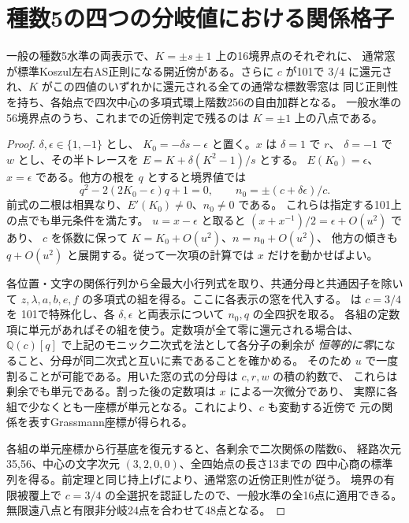 \section{種数5の四つの分岐値における関係格子}
\label{sec:rank-fifteen-pencil-ramified-ends}
\begin{theorem}\label{thm:rank-fifteen-pencil-ramified-ends}
一般の種数5水準の両表示で、$K=\pm s\pm1$ 上の16境界点のそれぞれに、
通常窓が標準Koszul左右AS正則になる開近傍がある。さらに $c$ が101で
$3/4$ に還元され、$K$ がこの四値のいずれかに還元される全ての通常な標数零窓は
同じ正則性を持ち、各始点で四次中心の多項式環上階数256の自由加群となる。
一般水準の56境界点のうち、これまでの近傍判定で残るのは $K=\pm1$ 上の八点である。
\end{theorem}
\begin{proof}
$\delta,\epsilon\in\{1,-1\}$ とし、
$K_0=-\delta s-\epsilon$ と置く。$x$ は $\delta=1$ で $r$、
$\delta=-1$ で $w$ とし、その半トレースを $E=K+\delta(K^2-1)/s$ とする。
$E(K_0)=\epsilon$、$x=\epsilon$ である。他方の根を $q$ とすると境界値では
\[
 q^2-2(2K_0-\epsilon)q+1=0,\qquad n_0=\pm(c+\delta\epsilon)/c .
\]
前式の二根は相異なり、$E'(K_0)\ne0$、$n_0\ne0$ である。
これらは指定する101上の点でも単元条件を満たす。
$u=x-\epsilon$ と取ると $(x+x^{-1})/2=\epsilon+O(u^2)$ であり、
$c$ を係数に保って $K=K_0+O(u^2)$、$n=n_0+O(u^2)$、
他方の傾きも $q+O(u^2)$ と展開する。従って一次項の計算では $x$ だけを動かせばよい。

各位置・文字の関係行列から全最大小行列式を取り、共通分母と共通因子を除いて
$z,\lambda,a,b,e,f$ の多項式の組を得る。ここに各表示の窓を代入する。
 は $c=3/4$ を
101で特殊化し、各 $\delta,\epsilon$ と両表示について $n_0,q$ の全四択を取る。
各組の定数項に単元があればその組を使う。定数項が全て零に還元される場合は、
$\mathbb Q(c)[q]$ で上記のモニック二次式を法として各分子の剰余が
\emph{恒等的に零}になること、分母が同二次式と互いに素であることを確かめる。
そのため $u$ で一度割ることが可能である。用いた窓の式の分母は $c,r,w$ の積の約数で、
これらは剰余でも単元である。割った後の定数項は $x$ による一次微分であり、
実際に各組で少なくとも一座標が単元となる。これにより、$c$ も変動する近傍で
元の関係を表すGrassmann座標が得られる。

各組の単元座標から行基底を復元すると、各剰余で二次関係の階数6、
経路次元35,56、中心の文字次元 $(3,2,0,0)$、全四始点の長さ13までの
四中心商の標準列を得る。前定理と同じ持上げにより、通常窓の近傍正則性が従う。
境界の有限被覆上で $c=3/4$ の全選択を認証したので、一般水準の全16点に適用できる。
無限遠八点と有限非分岐24点を合わせて48点となる。
\end{proof}

